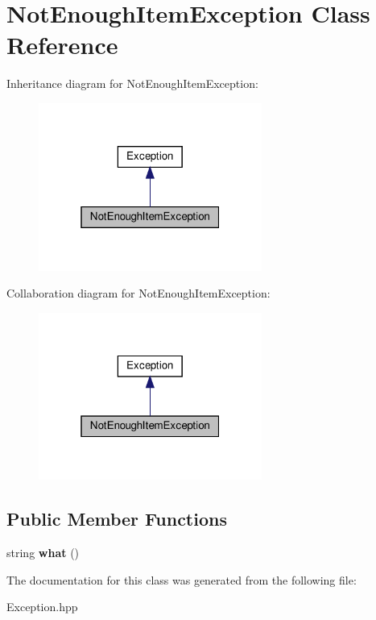 \hypertarget{classNotEnoughItemException}{}\section{Not\+Enough\+Item\+Exception Class Reference}
\label{classNotEnoughItemException}


Inheritance diagram for Not\+Enough\+Item\+Exception\+:
\nopagebreak
\begin{figure}[H]
\begin{center}
\leavevmode
\includegraphics[width=208pt]{classNotEnoughItemException__inherit__graph}
\end{center}
\end{figure}


Collaboration diagram for Not\+Enough\+Item\+Exception\+:
\nopagebreak
\begin{figure}[H]
\begin{center}
\leavevmode
\includegraphics[width=208pt]{classNotEnoughItemException__coll__graph}
\end{center}
\end{figure}
\subsection*{Public Member Functions}
\begin{DoxyCompactItemize}
\item 
\mbox{\label{classNotEnoughItemException_a750953eb87c1c4c2323c082fddb2b038}} 
string {\bfseries what} ()
\end{DoxyCompactItemize}


The documentation for this class was generated from the following file\+:\begin{DoxyCompactItemize}
\item 
Exception.\+hpp\end{DoxyCompactItemize}
